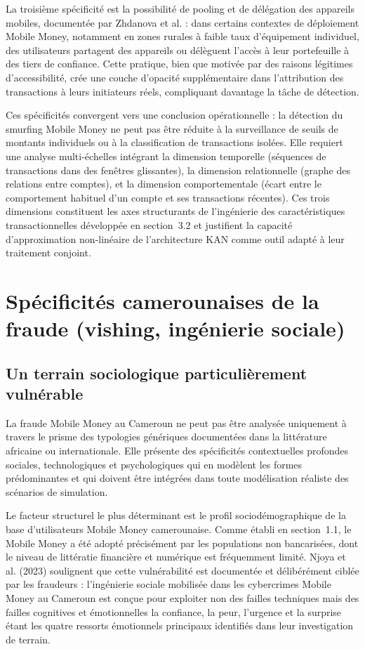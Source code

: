 \documentclass[11pt,a4paper,oneside]{report}
\theoremstyle{definition}
\theoremstyle{remark}
\begin{document}
La troisième spécificité est la possibilité de pooling et de délégation des appareils mobiles, documentée par Zhdanova et al. : dans certains contextes de déploiement Mobile Money, notamment en zones rurales à faible taux d'équipement individuel, des utilisateurs partagent des appareils ou délèguent l'accès à leur portefeuille à des tiers de confiance. Cette pratique, bien que motivée par des raisons légitimes d'accessibilité, crée une couche d'opacité supplémentaire dans l'attribution des transactions à leurs initiateurs réels, compliquant davantage la tâche de détection.

Ces spécificités convergent vers une conclusion opérationnelle : la détection du smurfing Mobile Money ne peut pas être réduite à la surveillance de seuils de montants individuels ou à la classification de transactions isolées. Elle requiert une analyse multi-échelles intégrant la dimension temporelle (séquences de transactions dans des fenêtres glissantes), la dimension relationnelle (graphe des relations entre comptes), et la dimension comportementale (écart entre le comportement habituel d'un compte et ses transactions récentes). Ces trois dimensions constituent les axes structurants de l'ingénierie des caractéristiques transactionnelles développée en section~3.2 et justifient la capacité d'approximation non-linéaire de l'architecture KAN comme outil adapté à leur traitement conjoint.

\section{Spécificités camerounaises de la fraude (vishing, ingénierie sociale)}

\subsection{Un terrain sociologique particulièrement vulnérable}

La fraude Mobile Money au Cameroun ne peut pas être analysée uniquement à travers le prisme des typologies génériques documentées dans la littérature africaine ou internationale. Elle présente des spécificités contextuelles profondes  sociales, technologiques et psychologiques  qui en modèlent les formes prédominantes et qui doivent être intégrées dans toute modélisation réaliste des scénarios de simulation.

Le facteur structurel le plus déterminant est le profil sociodémographique de la base d'utilisateurs Mobile Money camerounaise. Comme établi en section~1.1, le Mobile Money a été adopté précisément par les populations non bancarisées, dont le niveau de littératie financière et numérique est fréquemment limité. Njoya et al. (2023) soulignent que cette vulnérabilité est documentée et délibérément ciblée par les fraudeurs : l'ingénierie sociale mobilisée dans les cybercrimes Mobile Money au Cameroun est conçue pour exploiter non des failles techniques mais des failles cognitives et émotionnelles  la confiance, la peur, l'urgence et la surprise étant les quatre ressorts émotionnels principaux identifiés dans leur investigation de terrain.
\end{document}
